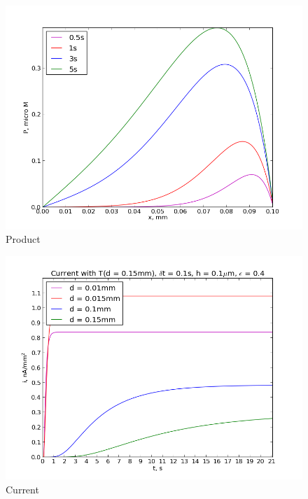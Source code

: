 \documentclass[12pt, a4paper, lithuanian]{article}
\begin{document}
\begin{figure}[H]
    \centering
    \includegraphics[scale=0.5]{img/P}
    \caption{Product}
    \label{img:mlp}
\end{figure}

\begin{figure}[H]
    \centering
    \includegraphics[scale=0.5]{img/i}
    \caption{Current}
    \label{img:mlp}
\end{figure}





%
\end{document}
